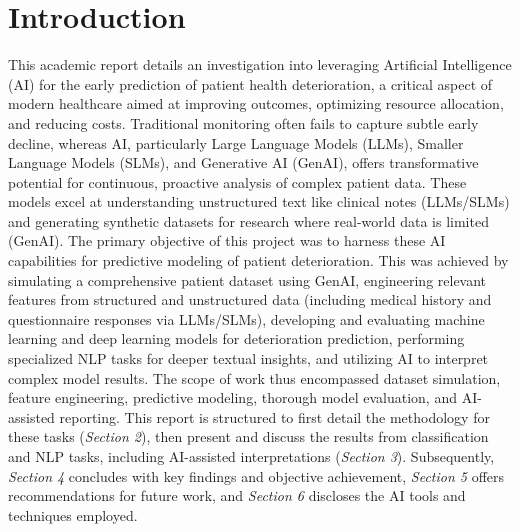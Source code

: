 \section{Introduction}

This academic report details an investigation into leveraging Artificial Intelligence (AI) for the early prediction of patient health deterioration, a critical aspect of modern healthcare aimed at improving outcomes, optimizing resource allocation, and reducing costs. Traditional monitoring often fails to capture subtle early decline, whereas AI, particularly Large Language Models (LLMs), Smaller Language Models (SLMs), and Generative AI (GenAI), offers transformative potential for continuous, proactive analysis of complex patient data. These models excel at understanding unstructured text like clinical notes (LLMs/SLMs) and generating synthetic datasets for research where real-world data is limited (GenAI). The primary objective of this project was to harness these AI capabilities for predictive modeling of patient deterioration. This was achieved by simulating a comprehensive patient dataset using GenAI, engineering relevant features from structured and unstructured data (including medical history and questionnaire responses via LLMs/SLMs), developing and evaluating machine learning and deep learning models for deterioration prediction, performing specialized NLP tasks for deeper textual insights, and utilizing AI to interpret complex model results. The scope of work thus encompassed dataset simulation, feature engineering, predictive modeling, thorough model evaluation, and AI-assisted reporting. This report is structured to first detail the methodology for these tasks (\textit{Section 2}), then present and discuss the results from classification and NLP tasks, including AI-assisted interpretations (\textit{Section 3}). Subsequently, \textit{Section 4} concludes with key findings and objective achievement, \textit{Section 5} offers recommendations for future work, and \textit{Section 6} discloses the AI tools and techniques employed.
